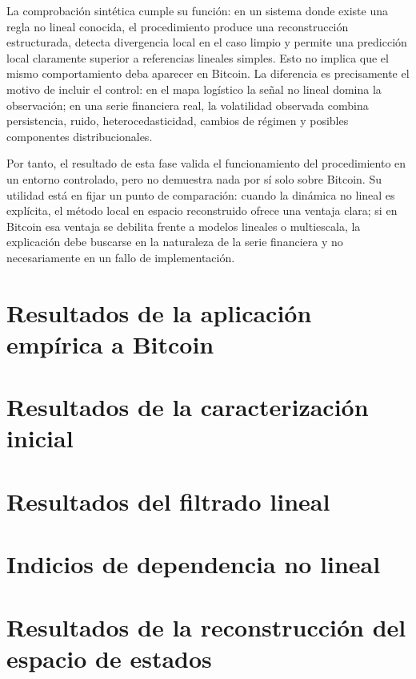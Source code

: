 La comprobación sintética cumple su función: en un sistema donde existe una regla no lineal conocida, el procedimiento produce una reconstrucción estructurada, detecta divergencia local en el caso limpio y permite una predicción local claramente superior a referencias lineales simples. Esto no implica que el mismo comportamiento deba aparecer en Bitcoin. La diferencia es precisamente el motivo de incluir el control: en el mapa logístico la señal no lineal domina la observación; en una serie financiera real, la volatilidad observada combina persistencia, ruido, heterocedasticidad, cambios de régimen y posibles componentes distribucionales.

Por tanto, el resultado de esta fase valida el funcionamiento del procedimiento en un entorno controlado, pero no demuestra nada por sí solo sobre Bitcoin. Su utilidad está en fijar un punto de comparación: cuando la dinámica no lineal es explícita, el método local en espacio reconstruido ofrece una ventaja clara; si en Bitcoin esa ventaja se debilita frente a modelos lineales o multiescala, la explicación debe buscarse en la naturaleza de la serie financiera y no necesariamente en un fallo de implementación.
\section{Resultados de la aplicación empírica a Bitcoin}\label{sec:resultados-aplicacion-bitcoin}

\section{Resultados de la caracterización inicial}\label{sec:resultados-caracterizacion}

\section{Resultados del filtrado lineal}\label{sec:resultados-filtrado}

\section{Indicios de dependencia no lineal}\label{sec:evidencia-no-lineal}

\section{Resultados de la reconstrucción del espacio de estados}\label{sec:resultados-reconstruccion}

